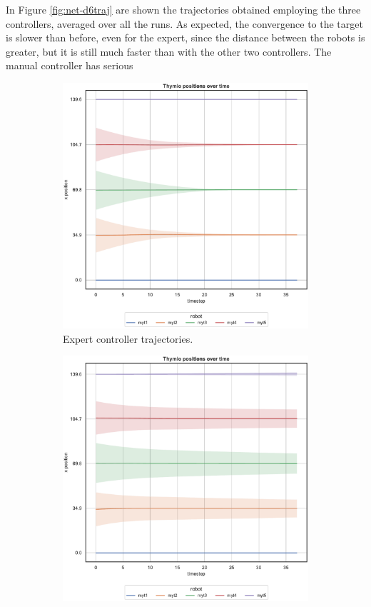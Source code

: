\bigskip
In Figure \ref{fig:net-d6traj} are shown the trajectories obtained employing the 
three controllers, averaged over all the runs.
As expected, the convergence to the target is slower than before, even for the 
expert, since the distance between the robots is greater, but it is still much faster 
than with the other two controllers.
The manual controller has serious
\begin{figure}[!htb]
	\begin{center}
		\begin{subfigure}[h]{0.49\textwidth}
			\centering
			\includegraphics[width=.9\textwidth]{contents/images/net-d6/position-overtime-omniscient}%
			\caption{Expert controller trajectories.}
		\end{subfigure}
		\hfill
		\begin{subfigure}[h]{0.49\textwidth}
			\centering
			\includegraphics[width=.9\textwidth]{contents/images/net-d6/position-overtime-learned_distributed}

\end{subfigure}
\end{center}
\end{figure}
